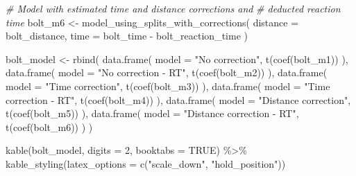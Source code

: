 \documentclass[fleqn,10pt,lineno]{wlpeerj} %
\newenvironment{Shaded}{\begin{snugshade}}{\end{snugshade}}
\newcommand{\AttributeTok}[1]{\textcolor[rgb]{0.77,0.63,0.00}{#1}}
\newcommand{\CommentTok}[1]{\textcolor[rgb]{0.56,0.35,0.01}{\textit{#1}}}
\newcommand{\ConstantTok}[1]{\textcolor[rgb]{0.00,0.00,0.00}{#1}}
\newcommand{\DecValTok}[1]{\textcolor[rgb]{0.00,0.00,0.81}{#1}}
\newcommand{\FunctionTok}[1]{\textcolor[rgb]{0.00,0.00,0.00}{#1}}
\newcommand{\NormalTok}[1]{#1}
\newcommand{\OtherTok}[1]{\textcolor[rgb]{0.56,0.35,0.01}{#1}}
\newcommand{\SpecialCharTok}[1]{\textcolor[rgb]{0.00,0.00,0.00}{#1}}
\newcommand{\StringTok}[1]{\textcolor[rgb]{0.31,0.60,0.02}{#1}}
\begin{document}
\begin{Shaded}
\begin{Highlighting}[]
\CommentTok{\# Model with estimated time and distance corrections and}
\CommentTok{\#  deducted reaction time}
\NormalTok{bolt\_m6 }\OtherTok{\textless{}{-}} \FunctionTok{model\_using\_splits\_with\_corrections}\NormalTok{(}
  \AttributeTok{distance =}\NormalTok{ bolt\_distance,}
  \AttributeTok{time =}\NormalTok{ bolt\_time }\SpecialCharTok{{-}}\NormalTok{ bolt\_reaction\_time}
\NormalTok{)}

\NormalTok{bolt\_model }\OtherTok{\textless{}{-}} \FunctionTok{rbind}\NormalTok{(}
  \FunctionTok{data.frame}\NormalTok{(}
    \AttributeTok{model =} \StringTok{"No correction"}\NormalTok{,}
    \FunctionTok{t}\NormalTok{(}\FunctionTok{coef}\NormalTok{(bolt\_m1))}
\NormalTok{  ),}
  \FunctionTok{data.frame}\NormalTok{(}
    \AttributeTok{model =} \StringTok{"No correction {-} RT"}\NormalTok{,}
    \FunctionTok{t}\NormalTok{(}\FunctionTok{coef}\NormalTok{(bolt\_m2))}
\NormalTok{  ),}
  \FunctionTok{data.frame}\NormalTok{(}
    \AttributeTok{model =} \StringTok{"Time correction"}\NormalTok{,}
    \FunctionTok{t}\NormalTok{(}\FunctionTok{coef}\NormalTok{(bolt\_m3))}
\NormalTok{  ),}
  \FunctionTok{data.frame}\NormalTok{(}
    \AttributeTok{model =} \StringTok{"Time correction {-} RT"}\NormalTok{,}
    \FunctionTok{t}\NormalTok{(}\FunctionTok{coef}\NormalTok{(bolt\_m4))}
\NormalTok{  ),}
  \FunctionTok{data.frame}\NormalTok{(}
    \AttributeTok{model =} \StringTok{"Distance correction"}\NormalTok{,}
    \FunctionTok{t}\NormalTok{(}\FunctionTok{coef}\NormalTok{(bolt\_m5))}
\NormalTok{  ),}
  \FunctionTok{data.frame}\NormalTok{(}
    \AttributeTok{model =} \StringTok{"Distance correction {-} RT"}\NormalTok{,}
    \FunctionTok{t}\NormalTok{(}\FunctionTok{coef}\NormalTok{(bolt\_m6))}
\NormalTok{  )}
\NormalTok{)}

\FunctionTok{kable}\NormalTok{(bolt\_model, }\AttributeTok{digits =} \DecValTok{2}\NormalTok{, }\AttributeTok{booktabs =} \ConstantTok{TRUE}\NormalTok{) }\SpecialCharTok{\%\textgreater{}\%}
  \FunctionTok{kable\_styling}\NormalTok{(}\AttributeTok{latex\_options =} \FunctionTok{c}\NormalTok{(}\StringTok{"scale\_down"}\NormalTok{, }\StringTok{"hold\_position"}\NormalTok{))}
\end{Highlighting}
\end{Shaded}
\end{document}
